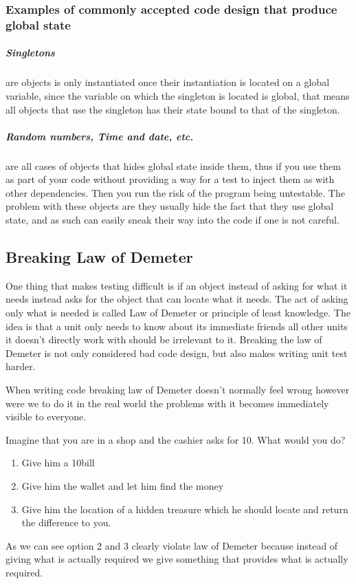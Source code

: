 \subsubsection*{Examples of commonly accepted code design that produce global state}


\subparagraph*{Singletons}

are objects is only instantiated once their instantiation is located
on a global variable, since the variable on which the singleton is
located is global, that means all objects that use the singleton has
their state bound to that of the singleton.


\subparagraph*{Random numbers, Time and date, etc.}

are all cases of objects that hides global state inside them, thus
if you use them as part of your code without providing a way for a
test to inject them as with other dependencies. Then you run the risk
of the program being untestable. The problem with these objects are
they usually hide the fact that they use global state, and as such
can easily sneak their way into the code if one is not careful. 


\subsection{Breaking Law of Demeter}

One thing that makes testing difficult is if an object instead of
asking for what it needs instead asks for the object that can locate
what it needs. The act of asking only what is needed is called Law
of Demeter or principle of least knowledge. The idea is that a unit
only needs to know about its immediate friends all other units it
doesn\textquoteright{}t directly work with should be irrelevant to
it. Breaking the law of Demeter is not only considered bad code design,
but also makes writing unit test harder.

When writing code breaking law of Demeter doesn\textquoteright{}t
normally feel wrong however were we to do it in the real world the
problems with it becomes immediately visible to everyone.

Imagine that you are in a shop and the cashier asks for 10\texteuro.
What would you do?
\begin{enumerate}
\item Give him a 10\texteuro bill
\item Give him the wallet and let him find the money
\item Give him the location of a hidden treasure which he should locate
and return the difference to you.
\end{enumerate}
As we can see option 2 and 3 clearly violate law of Demeter because
instead of giving what is actually required we give something that
provides what is actually required.

